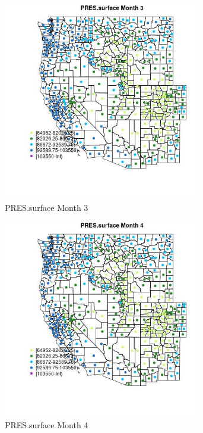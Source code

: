 \begin{figure} 
\centering  
\includegraphics[width=0.77\textwidth]{Code_Outputs/df_report_ML_predictors_CountyCentroid_Locations_Dates_2008-01-01to2018-12-31_MapObsMo3PRESsurface.jpg} 
\caption{\label{fig:df_report_ML_predictors_CountyCentroid_Locations_Dates_2008-01-01to2018-12-31MapObsMo3PRESsurface}PRES.surface Month 3} 
\end{figure} 
 

\begin{figure} 
\centering  
\includegraphics[width=0.77\textwidth]{Code_Outputs/df_report_ML_predictors_CountyCentroid_Locations_Dates_2008-01-01to2018-12-31_MapObsMo4PRESsurface.jpg} 
\caption{\label{fig:df_report_ML_predictors_CountyCentroid_Locations_Dates_2008-01-01to2018-12-31MapObsMo4PRESsurface}PRES.surface Month 4} 
\end{figure} 
 

